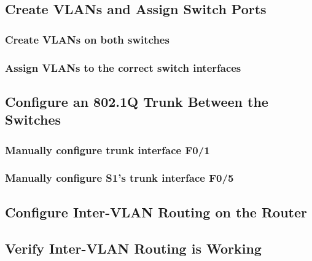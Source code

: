 \documentclass[a4paper]{article}
\begin{document}
\subsection{Create VLANs and Assign Switch Ports}



\subsubsection{Create VLANs on both switches}

\subsubsection{Assign VLANs to the correct switch interfaces}

\subsection{Configure an 802.1Q Trunk Between the Switches}

\subsubsection{Manually configure trunk interface F0/1}

\subsubsection{Manually configure S1’s trunk interface F0/5}

\subsection{Configure Inter-VLAN Routing on the Router}

\subsection{Verify Inter-VLAN Routing is Working}

\newpage
\end{document}
